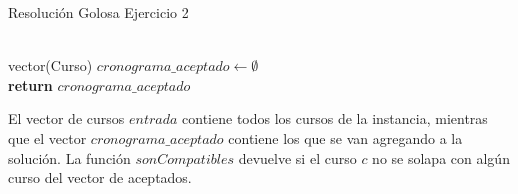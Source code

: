 \begin{algorithm}[H]
	\caption{Resolución Golosa Ejercicio 2}
	\begin{algorithmic}
		\\
		vector(Curso) $cronograma\_aceptado \longleftarrow \emptyset$\\
		\textbf{return} $cronograma\_aceptado$\\
	\end{algorithmic}
\end{algorithm}
\par{El vector de cursos $entrada$ contiene todos los cursos de la instancia, mientras que el vector $cronograma\_aceptado$ contiene los que se van agregando a la soluci\'on. La funci\'on $sonCompatibles$ devuelve si el curso $c$ no se solapa con alg\'un curso del vector de aceptados.}


